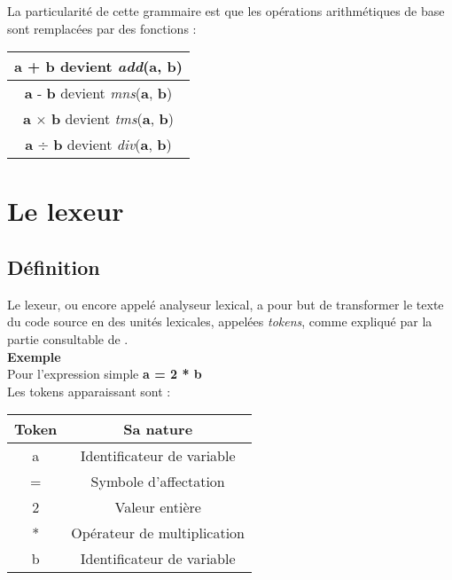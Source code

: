 \documentclass[a4paper]{article}%
\begin{document}
La particularité de cette grammaire est que les opérations arithmétiques de base sont remplacées par des fonctions :\\
\begin{center}
\begin{tabular}{ | c | }
    \hline
    \textbf{a} + \textbf{b} devient \textit{add}(\textbf{a}, \textbf{b})\\
    \hline
    \textbf{a} - \textbf{b} devient \textit{mns}(\textbf{a}, \textbf{b})\\
    \hline
    \textbf{a} $\times$ \textbf{b} devient \textit{tms}(\textbf{a}, \textbf{b})\\
    \hline
    \textbf{a} $\div$ \textbf{b} devient \textit{div}(\textbf{a}, \textbf{b})\\
    \hline
\end{tabular}
\end{center}


\clearpage{}


\section{Le lexeur}

\subsection{Définition}

 Le lexeur, ou encore appelé analyseur lexical, a pour but de transformer le texte du code source en des unités lexicales, appelées \textit{tokens}, comme expliqué par la partie consultable de  \cite{flexBisonHandbook}. \\

\textbf{Exemple} \\
    Pour l'expression simple \textbf{a = 2 * b} \\
    Les tokens apparaissant sont : \\
    \begin{center}
    \begin{tabular}{ | c | c | }
    \hline
    \textbf{Token} & \textbf{Sa nature} \\
    \hline
    a & Identificateur de variable \\
    \hline
    = & Symbole d'affectation \\
    \hline
    2 & Valeur entière \\
    \hline
    * & Opérateur de multiplication \\
    \hline
    b & Identificateur de variable \\
    \hline
\end{tabular}
\end{center}
\end{document}
